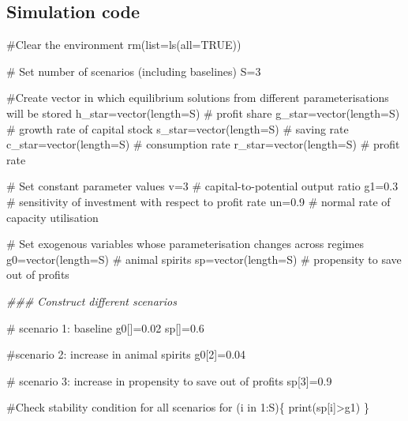\documentclass[
  letterpaper,
  DIV=11,
  numbers=noendperiod]{scrreprt}
\newenvironment{Shaded}{\begin{snugshade}}{\end{snugshade}}
\newcommand{\AttributeTok}[1]{\textcolor[rgb]{0.40,0.45,0.13}{#1}}
\newcommand{\CommentTok}[1]{\textcolor[rgb]{0.37,0.37,0.37}{#1}}
\newcommand{\ConstantTok}[1]{\textcolor[rgb]{0.56,0.35,0.01}{#1}}
\newcommand{\ControlFlowTok}[1]{\textcolor[rgb]{0.00,0.23,0.31}{#1}}
\newcommand{\DecValTok}[1]{\textcolor[rgb]{0.68,0.00,0.00}{#1}}
\newcommand{\DocumentationTok}[1]{\textcolor[rgb]{0.37,0.37,0.37}{\textit{#1}}}
\newcommand{\FloatTok}[1]{\textcolor[rgb]{0.68,0.00,0.00}{#1}}
\newcommand{\FunctionTok}[1]{\textcolor[rgb]{0.28,0.35,0.67}{#1}}
\newcommand{\NormalTok}[1]{\textcolor[rgb]{0.00,0.23,0.31}{#1}}
\newcommand{\OtherTok}[1]{\textcolor[rgb]{0.00,0.23,0.31}{#1}}
\newcommand{\SpecialCharTok}[1]{\textcolor[rgb]{0.37,0.37,0.37}{#1}}
\begin{document}
\subsection{Simulation code}\label{simulation-code-4}

\begin{Shaded}
\begin{Highlighting}[]
\CommentTok{\#Clear the environment}
\FunctionTok{rm}\NormalTok{(}\AttributeTok{list=}\FunctionTok{ls}\NormalTok{(}\AttributeTok{all=}\ConstantTok{TRUE}\NormalTok{))}

\CommentTok{\# Set number of scenarios (including baselines)}
\NormalTok{S}\OtherTok{=}\DecValTok{3}

\CommentTok{\#Create vector in which equilibrium solutions from different parameterisations will be stored}
\NormalTok{h\_star}\OtherTok{=}\FunctionTok{vector}\NormalTok{(}\AttributeTok{length=}\NormalTok{S) }\CommentTok{\# profit share}
\NormalTok{g\_star}\OtherTok{=}\FunctionTok{vector}\NormalTok{(}\AttributeTok{length=}\NormalTok{S) }\CommentTok{\# growth rate of capital stock}
\NormalTok{s\_star}\OtherTok{=}\FunctionTok{vector}\NormalTok{(}\AttributeTok{length=}\NormalTok{S) }\CommentTok{\# saving rate}
\NormalTok{c\_star}\OtherTok{=}\FunctionTok{vector}\NormalTok{(}\AttributeTok{length=}\NormalTok{S) }\CommentTok{\# consumption rate}
\NormalTok{r\_star}\OtherTok{=}\FunctionTok{vector}\NormalTok{(}\AttributeTok{length=}\NormalTok{S) }\CommentTok{\# profit rate}

\CommentTok{\# Set constant parameter values}
\NormalTok{v}\OtherTok{=}\DecValTok{3}    \CommentTok{\# capital{-}to{-}potential output ratio}
\NormalTok{g1}\OtherTok{=}\FloatTok{0.3} \CommentTok{\# sensitivity of investment with respect to profit rate }
\NormalTok{un}\OtherTok{=}\FloatTok{0.9} \CommentTok{\# normal rate of capacity utilisation}

\CommentTok{\# Set exogenous variables whose parameterisation changes across regimes }
\NormalTok{g0}\OtherTok{=}\FunctionTok{vector}\NormalTok{(}\AttributeTok{length=}\NormalTok{S) }\CommentTok{\# animal spirits}
\NormalTok{sp}\OtherTok{=}\FunctionTok{vector}\NormalTok{(}\AttributeTok{length=}\NormalTok{S) }\CommentTok{\# propensity to save out of profits}

\DocumentationTok{\#\#\# Construct different scenarios }

\CommentTok{\# scenario 1: baseline }
\NormalTok{g0[]}\OtherTok{=}\FloatTok{0.02}
\NormalTok{sp[]}\OtherTok{=}\FloatTok{0.6}

\CommentTok{\#scenario 2: increase in animal spirits}
\NormalTok{g0[}\DecValTok{2}\NormalTok{]}\OtherTok{=}\FloatTok{0.04}

\CommentTok{\# scenario 3: increase in propensity to save out of profits}
\NormalTok{sp[}\DecValTok{3}\NormalTok{]}\OtherTok{=}\FloatTok{0.9}

\CommentTok{\#Check  stability condition for all scenarios}
\ControlFlowTok{for}\NormalTok{ (i }\ControlFlowTok{in} \DecValTok{1}\SpecialCharTok{:}\NormalTok{S)\{}
  \FunctionTok{print}\NormalTok{(sp[i]}\SpecialCharTok{\textgreater{}}\NormalTok{g1)}
\NormalTok{\}}
\end{Highlighting}
\end{Shaded}
\end{document}
